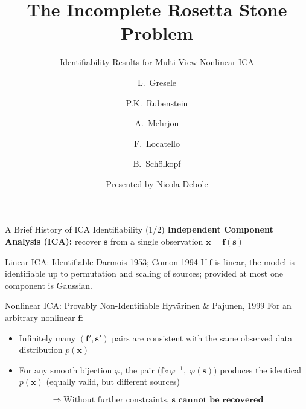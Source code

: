 \documentclass[aspectratio=169, 10pt]{beamer}
\title[Rosetta Stone Problem]{The Incomplete Rosetta Stone Problem}
\subtitle{Identifiability Results for Multi-View Nonlinear ICA}
\author[Gresele et al.\ 2020]{%
  L.~Gresele \and P.K.~Rubenstein \and A.~Mehrjou \and
  F.~Locatello \and B.~Schölkopf}
\institute[UAI 2020]{Uncertainty in Artificial Intelligence (UAI), 2020}
\date{Presented by Nicola Debole}
\begin{document}

\maketitle

\begin{frame}{A Brief History of ICA Identifiability (1/2)}
  \textbf{Independent Component Analysis (ICA):} recover $\mathbf{s}$ from a single observation
  $\mathbf{x}=\mathbf{f}(\mathbf{s})$

  \bigskip
  \begin{block}{Linear ICA: Identifiable \hfill\normalfont\small Darmois 1953; Comon 1994}
    If $\mathbf{f}$ is linear, the model is identifiable up to permutation and scaling of
    sources; provided at most one component is Gaussian.
  \end{block}

  \bigskip
  \begin{alertblock}{Nonlinear ICA: Provably Non-Identifiable
      \hfill\normalfont\small Hyvärinen \& Pajunen, 1999}
    For an arbitrary nonlinear $\mathbf{f}$:
    \begin{itemize}
      \item Infinitely many $(\mathbf{f}',\mathbf{s}')$ pairs are consistent with the same
            observed data distribution $p(\mathbf{x})$
      \item For any smooth bijection $\varphi$, the pair
            $\bigl(\mathbf{f}\circ\varphi^{-1},\;\varphi(\mathbf{s})\bigr)$
            produces the identical $p(\mathbf{x})$ (equally valid, but different sources)
    \end{itemize}
    \[
      \Rightarrow \text{Without further constraints, } \mathbf{s}
      \textbf{ cannot be recovered}
    \]
  \end{alertblock}
\end{frame}
\end{document}
